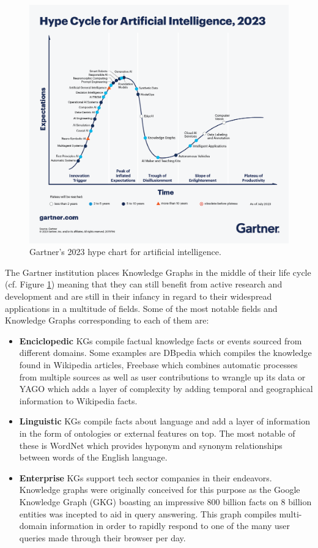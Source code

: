 \begin{figure}[!htp]
    \centering
    \includegraphics[width=\textwidth]{fig/intro/Gartner_2023.png}
    \caption{Gartner's 2023 hype chart for artificial intelligence.}
    \label{fig:garter-chart}
\end{figure}

The Gartner institution places Knowledge Graphs in the middle of their life cycle (cf. Figure \ref{fig:garter-chart}) meaning that they can still benefit from active research and development and are still in their infancy in regard to their widespread applications in a multitude of fields. Some of the most notable fields and Knowledge Graphs corresponding to each of them are:
\begin{itemize}
    \item \textbf{Enciclopedic} KGs compile factual knowledge facts or events sourced from different domains. Some examples are DBpedia\cite{auer2007dbpedia} which compiles the knowledge found in Wikipedia articles, Freebase\cite{bollacker2007freebase} which combines automatic processes from multiple sources as well as user contributions to wrangle up its data or YAGO\cite{suchanek2007yago} which adds a layer of complexity by adding temporal and geographical information to Wikipedia facts.
    \item \textbf{Linguistic} KGs compile facts about language and add a layer of information in the form of ontologies or external features on top. The most notable of these is WordNet\cite{miller1995wordnet} which provides hyponym and synonym relationships between words of the English language.
    \item \textbf{Enterprise} KGs support tech sector companies in their endeavors. Knowledge graphs were originally conceived for this purpose as the Google Knowledge Graph (GKG) \cite{steiner2012adding} boasting an impressive 800 billion facts on 8 billion entities was incepted to aid in query answering. This graph compiles multi-domain information in order to rapidly respond to one of the many user queries made through their browser per day. 
    
\end{itemize}

